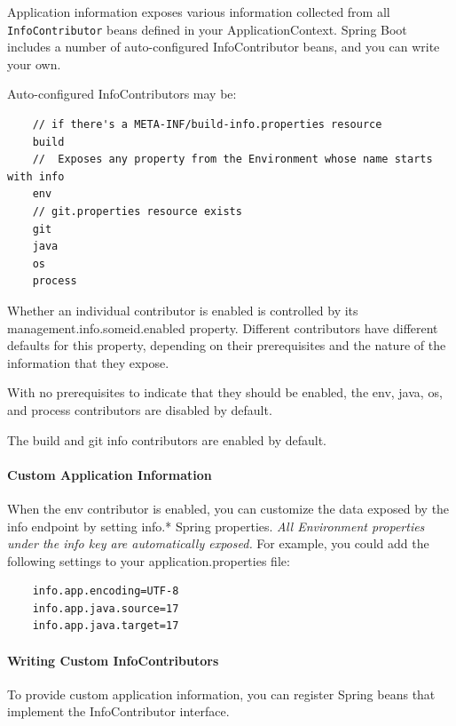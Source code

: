 \documentclass{scrartcl}
\begin{document}
Application information exposes various information collected from all \lstinline|InfoContributor| beans defined in your ApplicationContext. Spring Boot includes a number of auto-configured InfoContributor beans, and you can write your own.

Auto-configured InfoContributors may be:

\begin{lstlisting}
    // if there's a META-INF/build-info.properties resource
    build
    //  Exposes any property from the Environment whose name starts with info
    env
    // git.properties resource exists
    git
    java
    os
    process
\end{lstlisting}

Whether an individual contributor is enabled is controlled by its management.info.someid.enabled property.
Different contributors have different defaults for this property, depending on their prerequisites and the nature of the information that they expose.

With no prerequisites to indicate that they should be enabled, the env, java, os, and process contributors are disabled by default.

The build and git info contributors are enabled by default.

\paragraph{Custom Application Information}

When the env contributor is enabled, you can customize the data exposed by the info endpoint by setting info.* Spring properties. \textit{All Environment properties under the info key are automatically exposed.} For example, you could add the following settings to your application.properties file:

    \begin{lstlisting}
    info.app.encoding=UTF-8
    info.app.java.source=17
    info.app.java.target=17

    \end{lstlisting}

\paragraph{Writing Custom InfoContributors}

    To provide custom application information, you can register Spring beans that implement the InfoContributor interface.
\end{document}
